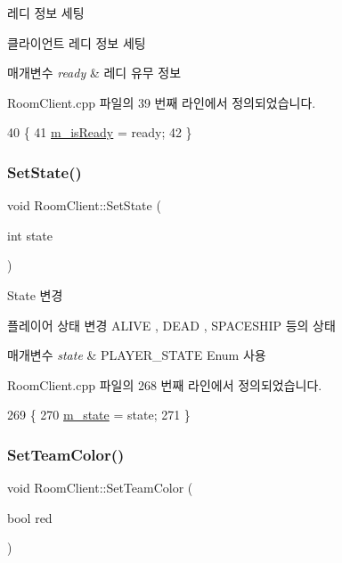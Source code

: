 레디 정보 세팅 

클라이언트 레디 정보 세팅


\begin{DoxyParams}{매개변수}
{\em ready} & 레디 유무 정보 \\
\hline
\end{DoxyParams}


Room\+Client.\+cpp 파일의 39 번째 라인에서 정의되었습니다.


\begin{DoxyCode}
40 \{
41     \hyperlink{class_room_client_a09fb4ef6ca643e53d68ad771761e8289}{m\_isReady} = ready;
42 \}
\end{DoxyCode}
\mbox{\label{class_room_client_a2391082059ef2e5148ba9e74baf6259e}} 
\subsubsection{\texorpdfstring{Set\+State()}{SetState()}}
{\footnotesize\ttfamily void Room\+Client\+::\+Set\+State (\begin{DoxyParamCaption}\item[{int}]{state }\end{DoxyParamCaption})}



State 변경 

플레이어 상태 변경  A\+L\+I\+VE , D\+E\+AD , S\+P\+A\+C\+E\+S\+H\+IP 등의 상태


\begin{DoxyParams}{매개변수}
{\em state} & P\+L\+A\+Y\+E\+R\+\_\+\+S\+T\+A\+TE Enum 사용 \\
\hline
\end{DoxyParams}


Room\+Client.\+cpp 파일의 268 번째 라인에서 정의되었습니다.


\begin{DoxyCode}
269 \{
270     \hyperlink{class_room_client_a247e5deb46a11e0d1a0e8e9029d87d54}{m\_state} = state;
271 \}
\end{DoxyCode}
\mbox{\label{class_room_client_aa8ad3112c6dcf60baa32ad9561d78616}} 
\subsubsection{\texorpdfstring{Set\+Team\+Color()}{SetTeamColor()}}
{\footnotesize\ttfamily void Room\+Client\+::\+Set\+Team\+Color (\begin{DoxyParamCaption}\item[{bool}]{red }\end{DoxyParamCaption})}



